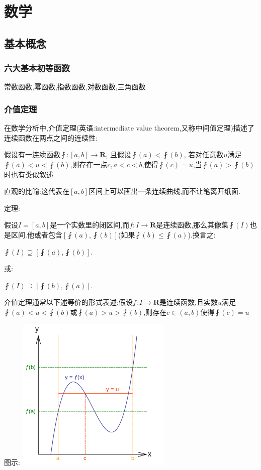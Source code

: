 \documentclass[UTF8,12pt]{ctexbook}
\begin{document}
\chapter{数学}{

\section{基本概念}{

\subsection{六大基本初等函数}{
  常数函数,幂函数,指数函数,对数函数,三角函数
}%

\subsection{介值定理}{

在数学分析中,介值定理(英语:intermediate value theorem,又称中间值定理)描述了连续函数在两点之间的连续性:

假设有一连续函数$\fint:[a,b]\rightarrow \mathbf{R}$, 且假设$\fint(a)<\fint(b)$, 若对任意数$u$满足$\fint(a)<u<\fint(b)$,则存在一点$c,a<c<b$,使得$\fint(c) = u$,当$\fint(a)>\fint(b)$时也有类似叙述

直观的比喻:这代表在$[a,b]$区间上可以画出一条连续曲线,而不让笔离开纸面.
\newline

定理:

假设$I = [a,b]$是一个实数里的闭区间,而$f:I\rightarrow\mathbf{R}$是连续函数,那么其像集$\fint(I)$也是区间.他或者包含$[\fint(a),\fint(b)]$(如果$\fint(b)\leq\fint(a)$).换言之:

$\fint(I)\supseteq[\fint(a),\fint(b)]$.

或:

$\fint(I)\supseteq[\fint(b), \fint(a)]$.

介值定理通常以下述等价的形式表述:假设$f:I\rightarrow\mathbf{R}$是连续函数,且实数$u$满足$\fint(a)<u<\fint(b)$或$\fint(a)>u>\fint(b)$,则存在$c\in(a,b)$使得$\fint(c) = u$

图示:
\includegraphics{resources/Intermediatevaluetheorem.png}
}%

}}
\end{document}
